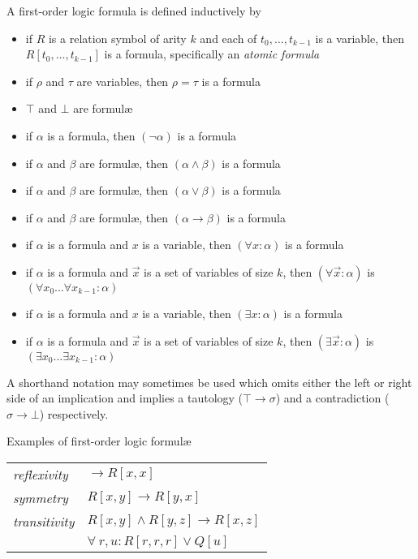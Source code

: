 		A first-order logic formula is defined inductively by
		\begin{itemize}
		\item if $R$ is a relation symbol of arity $k$ and each of $t_0 , \ldots , t_{k-1}$ is a variable, then $R[t_0,\ldots,t_{k-1}]$ is a formula, specifically an \emph{atomic formula}
		\item if $\rho$ and $\tau$ are variables, then $\rho = \tau$ is a formula
		\item $\top$ and $\bot$ are formul{\ae}
		\item if $\alpha$ is a formula, then $(\neg\alpha)$ is a formula
		\item if $\alpha$ and $\beta$ are formul{\ae}, then $(\alpha \wedge \beta)$ is a formula
		\item if $\alpha$ and $\beta$ are formul{\ae}, then $(\alpha \vee \beta)$ is a formula
		\item if $\alpha$ and $\beta$ are formul{\ae}, then $(\alpha \to \beta)$ is a formula
		\item if $\alpha$ is a formula and $x$ is a variable, then $(\forall x : \alpha)$ is a formula
		\item if $\alpha$ is a formula and $\vec{x}$ is a set of variables of size $k$, then $(\forall \vec{x} : \alpha)$ is $(\forall x_0 \ldots \forall x_{k-1} : \alpha)$
		\item if $\alpha$ is a formula and $x$ is a variable, then $(\exists x : \alpha)$ is a formula
		\item if $\alpha$ is a formula and $\vec{x}$ is a set of variables of size $k$, then $(\exists \vec{x} : \alpha)$ is $(\exists x_0 \ldots \exists x_{k-1} : \alpha)$
		\end{itemize}

		A shorthand notation may sometimes be used which omits either the left
		or right side of an implication and implies a tautology ($\top \to
		\sigma$) and a contradiction ($\sigma \to \bot$) respectively.

		Examples of first-order logic formul{\ae}

		\begin{tabular}{ll}
		\emph{reflexivity}  \quad  &  $\to R[x,x]$                         \\
		\emph{symmetry}     \quad  &  $R[x,y] \to R[y,x]$                  \\
		\emph{transitivity} \quad  &  $R[x,y] \wedge R[y,z] \to R[x,z]$    \\
		                           &  $\forall\ r,u : R[r,r,r] \vee Q[u]$  \\
		\end{tabular}

